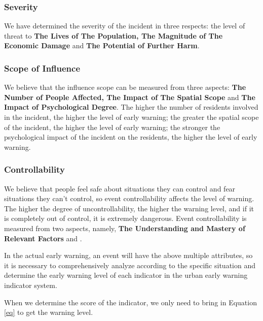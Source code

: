 \documentclass[12pt]{article}  %
\begin{document}
\subsubsection{Severity}
We have determined the severity of the incident in three respects: the level of threat to \textbf{The Lives of The Population, The Magnitude of The Economic Damage} and \textbf{The Potential of Further Harm}.
\subsubsection{Scope of Influence}
We believe that the influence scope can be measured from three aspects: \textbf{The Number of People Affected, The Impact of The Spatial Scope} and \textbf{The Impact of Psychological Degree}. The higher the number of residents involved in the incident, the higher the level of early warning; the greater the spatial scope of the incident, the higher the level of early warning; the stronger the psychological impact of the incident on the residents, the higher the level of early warning.
\subsubsection{Controllability}
We believe that people feel safe about situations they can control and fear situations they can't control, so event controllability affects the level of warning. The higher the degree of uncontrollability, the higher the warning level, and if it is completely out of control, it is extremely dangerous. Event controllability is measured from two aspects, namely, \textbf{The Understanding and Mastery of Relevant Factors} and .

In the actual early warning, an event will have the above multiple attributes, so it is necessary to comprehensively analyze according to the specific situation and determine the early warning level of each indicator in the urban early warning indicator system.

When we determine the score of the indicator, we only need to bring in Equation \ref{eq} to get the warning level.
\end{document}
